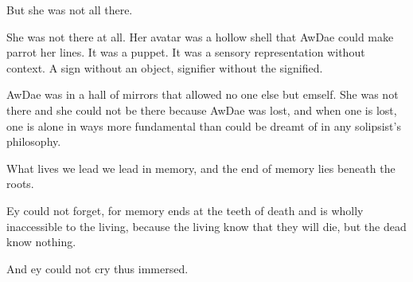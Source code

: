 But she was not all there.

She was not there at all. Her avatar was a hollow shell that AwDae could make parrot her lines. It was a puppet. It was a sensory representation without context. A sign without an object, signifier without the signified.

AwDae was in a hall of mirrors that allowed no one else but emself. She was not there and she could not be there because AwDae was lost, and when one is lost, one is alone in ways more fundamental than could be dreamt of in any solipsist's philosophy.

What lives we lead we lead in memory, and the end of memory lies beneath the roots.

Ey could not forget, for memory ends at the teeth of death and is wholly inaccessible to the living, because the living know that they will die, but the dead know nothing.

And ey could not cry thus immersed.
